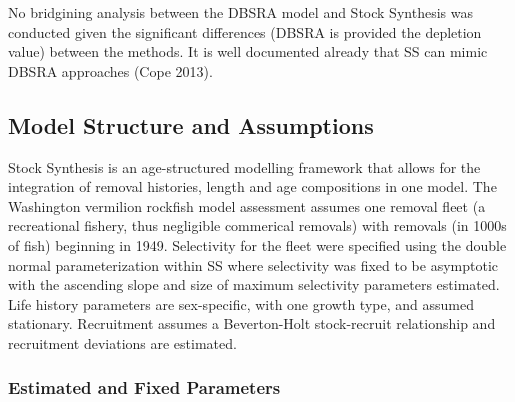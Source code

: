 \documentclass[11pt,
  english,
  a4paper,
]{article}
\begin{document}
\leavevmode\tagmcend\tagstructend


No bridgining analysis between the DBSRA model and Stock Synthesis was conducted given the significant differences (DBSRA is provided the depletion value) between the methods. It is well documented already that SS can mimic DBSRA approaches {(Cope 2013)\leavevmode\tagmcend\tagstructend}.

\leavevmode\tagmcend\tagstructend\par


\hypertarget{model-structure-and-assumptions}{%
\subsection{Model Structure and Assumptions}\label{model-structure-and-assumptions}}

\leavevmode\tagmcend\tagstructend


Stock Synthesis is an age-structured modelling framework that allows for the integration of removal histories, length and age compositions in one model. The Washington vermilion rockfish model assessment assumes one removal fleet (a recreational fishery, thus negligible commerical removals) with removals (in 1000s of fish) beginning in 1949. Selectivity for the fleet were specified using the double normal parameterization within SS where selectivity was fixed to be asymptotic with the ascending slope and size of maximum selectivity parameters estimated. Life history parameters are sex-specific, with one growth type, and assumed stationary. Recruitment assumes a Beverton-Holt stock-recruit relationship and recruitment deviations are estimated.

\leavevmode\tagmcend\tagstructend\par


\hypertarget{estimated-and-fixed-parameters}{%
\subsubsection{Estimated and Fixed Parameters}\label{estimated-and-fixed-parameters}}

\leavevmode\tagmcend\tagstructend
\end{document}

